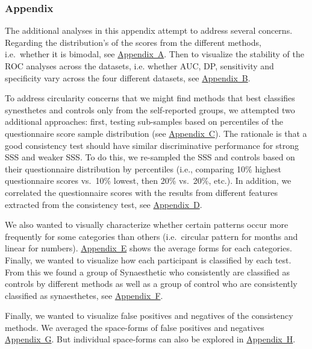 \documentclass[
  man,
  floatsintext,
  longtable,
  a4paper,
  nolmodern,
  notxfonts,
  notimes,
  colorlinks=true,linkcolor=blue,citecolor=blue,urlcolor=blue]{apa7}
\begin{document}
\newpage{}

\subsubsection{Appendix}\label{appendix}

The additional analyses in this appendix attempt to address several
concerns. Regarding the distribution's of the scores from the different
methods, i.e.~whether it is bimodal, see
\hyperref[apx-featDensity]{Appendix~A}. Then to visualize the stability
of the ROC analyses across the datasets, i.e. whether AUC, DP,
sensitivity and specificity vary across the four different datasets, see
\hyperref[apx-SM2byds]{Appendix~B}.

To address circularity concerns that we might find methods that best
classifies synesthetes and controls only from the self-reported groups,
we attempted two additional approaches: first, testing sub-samples based
on percentiles of the questionnaire score sample distribution (see
\hyperref[apx-byquestperc]{Appendix~C}). The rationale is that a good
consistency test should have similar discriminative performance for
strong SSS and weaker SSS. To do this, we re-sampled the SSS and
controls based on their questionnaire distribution by percentiles (i.e.,
comparing 10\% highest questionnaire scores vs.~10\% lowest, then 20\%
vs.~20\%, etc.). In addition, we correlated the questionnaire scores
with the results from different features extracted from the consistency
test, see \hyperref[apx-correlation-with-self-report]{Appendix~D}.

We also wanted to visually characterize whether certain patterns occur
more frequently for some categories than others (i.e.~circular pattern
for months and linear for numbers).
\hyperref[apx-average-forms]{Appendix~E} shows the average forms for
each categories. Finally, we wanted to visualize how each participant is
classified by each test. From this we found a group of Synaesthetic who
consistently are classified as controls by different methods as well as
a group of control who are consistently classified as synaesthetes, see
\hyperref[apx-alluvial]{Appendix~F}.

Finally, we wanted to visualize false positives and negatives of the
consistency methods. We averaged the space-forms of false positives and
negatives
\hyperref[apx-false-positive-and-negative-analysis]{Appendix~G}. But
individual space-forms can also be explored in
\hyperref[apx-all-participants-spatial-forms]{Appendix~H}.
\end{document}
